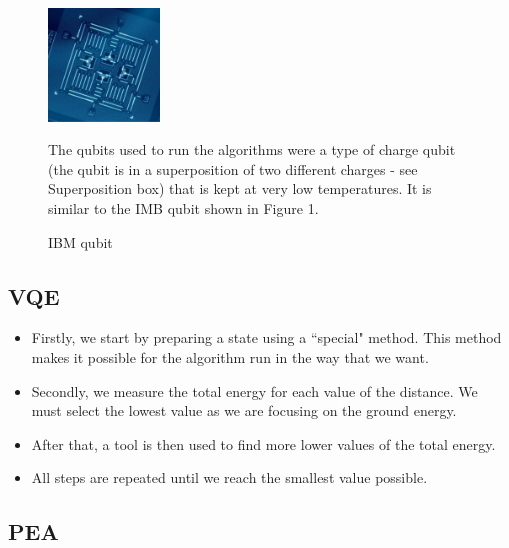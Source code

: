 \documentclass[14pt,landscape,color=UCLdarkred,margin=3cm]{uclposter}
\begin{document}
\begin{multicols}{3}
\begin{figure}[H]
  \begin{center}
  \begin{minipage}[c]{8em}
    \includegraphics[width=8em]{4_Qubit.png}
    \caption{IBM qubit}
  \end{minipage}
  \qquad
  \begin{minipage}[c]{20em}
The qubits used to run the algorithms were a type of charge qubit (the qubit is in a superposition of two different charges - see Superposition box) that is kept at very low temperatures. It is similar to the IMB qubit shown in Figure 1.
  \end{minipage}
  \end{center}

   
\end{figure}




\subsection*{VQE}
\begin{highlightbox}
  \begin{itemize}
\item Firstly, we start by preparing a state using a ``special" method. This method makes it possible for the algorithm run in the way that we want.
\item Secondly, we measure the total energy for each value of the distance. We must select the lowest value as we are focusing on the ground energy.
\item After that, a tool is then used to find more lower values of the total energy.
\item All steps are repeated until we reach the smallest value possible.
\end{itemize}
\end{highlightbox}

\subsection*{PEA}



\end{multicols}
\end{document}
